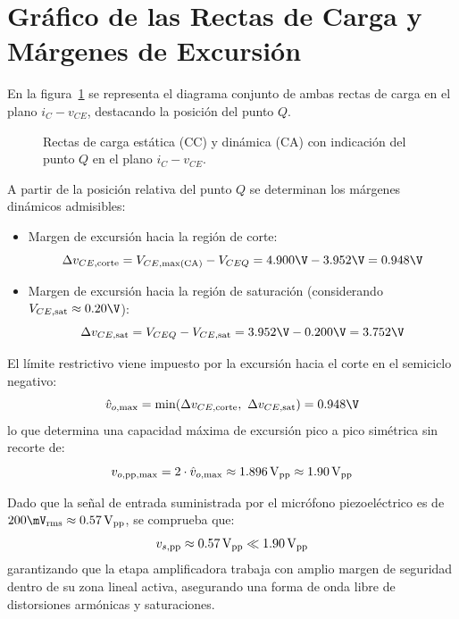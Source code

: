 \section{Gráfico de las Rectas de Carga y Márgenes de Excursión}

En la figura~\ref{fig:rectas_de_carga} se representa el diagrama conjunto de ambas rectas de carga en el plano
$i_C - v_{CE}$, destacando la posición del punto $Q$.

\begin{figure}[!ht]
  \centering
  
  \caption{Rectas de carga estática (CC) y dinámica (CA) con indicación del punto $Q$ en el plano $i_C - v_{CE}$.}
  \label{fig:rectas_de_carga}
\end{figure}

A partir de la posición relativa del punto $Q$ se determinan los márgenes dinámicos admisibles:
\begin{itemize}
  \item Margen de excursión hacia la región de corte:
    \begin{equation}
      \Delta v_{CE,\mathrm{corte}} = V_{CE,\mathrm{max(CA)}} - V_{CEQ} = 4.900\V - 3.952\V = 0.948\V
    \end{equation}
  \item Margen de excursión hacia la región de saturación (considerando $V_{CE,\mathrm{sat}} \approx 0.20\V$):
    \begin{equation}
      \Delta v_{CE,\mathrm{sat}} = V_{CEQ} - V_{CE,\mathrm{sat}} = 3.952\V - 0.200\V = 3.752\V
    \end{equation}
\end{itemize}

El límite restrictivo viene impuesto por la excursión hacia el corte en el semiciclo negativo:
\begin{equation}
  \hat{v}_{o,\mathrm{max}} = \min(\Delta v_{CE,\mathrm{corte}},\ \Delta v_{CE,\mathrm{sat}}) = 0.948\V
\end{equation}
lo que determina una capacidad máxima de excursión pico a pico simétrica sin recorte de:
\begin{equation}
  v_{o,\mathrm{pp,max}} = 2 \cdot \hat{v}_{o,\mathrm{max}} \approx 1.896\,\mathrm{V}_{\mathrm{pp}} \approx 1.90\,\mathrm{V}_{\mathrm{pp}}
  \label{eq:vo_pp_max}
\end{equation}

Dado que la señal de entrada suministrada por el micrófono piezoeléctrico es de $200\mV_{\mathrm{rms}} \approx 0.57\Vpp$,
se comprueba que:
\begin{equation}
  v_{s,\mathrm{pp}} \approx 0.57\,\mathrm{V}_{\mathrm{pp}} \ll 1.90\,\mathrm{V}_{\mathrm{pp}}
\end{equation}
garantizando que la etapa amplificadora trabaja con amplio margen de seguridad dentro de su zona lineal activa,
asegurando una forma de onda libre de distorsiones armónicas y saturaciones.
